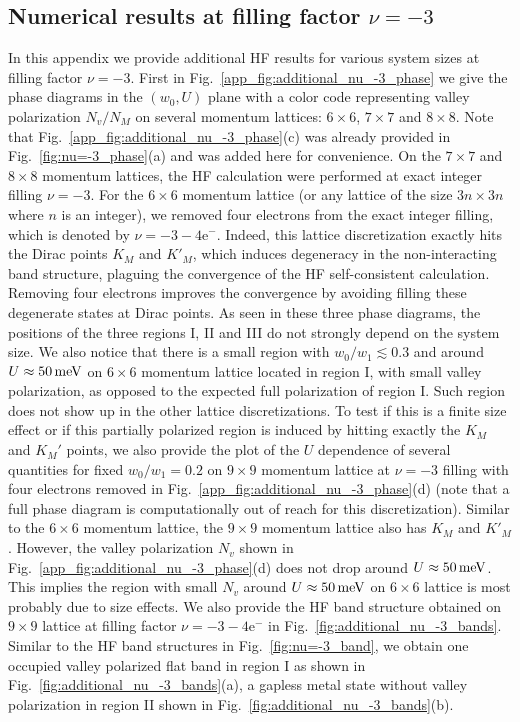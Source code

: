 \documentclass[prb,aps,nofootinbib,amssymb,twocolumn,superscriptaddress,10pt]{revtex4-2}
\begin{document}
\begin{widetext}
\subsection{Numerical results at filling factor \texorpdfstring{$\nu=-3$}{nu=-3}}\label{app_subsec:-3}
In this appendix we provide additional HF results for various system sizes at filling factor $\nu=-3$. First in Fig.~\ref{app_fig:additional_nu_-3_phase} we give the phase diagrams in the $(w_0, U)$ plane with a color code representing valley polarization $N_v/N_M$ on several momentum lattices: $6\times 6$, $7\times 7$ and $8\times 8$. Note that Fig.~\ref{app_fig:additional_nu_-3_phase}(c) was already provided in Fig.~\ref{fig:nu=-3_phase}(a) and was added here for convenience. On the $7\times 7$ and $8\times 8$ momentum lattices, the HF calculation were performed at exact integer filling $\nu=-3$. For the $6\times 6$ momentum lattice (or any lattice of the size $3n \times 3n$ where $n$ is an integer), we removed four electrons from the exact integer filling, which is denoted by $\nu=-3 - 4\mathrm{e}^-$. Indeed, this lattice discretization exactly hits the Dirac points $K_M$ and $K'_M$, which induces degeneracy in the non-interacting band structure, plaguing the convergence of the HF self-consistent calculation. Removing four electrons improves the convergence by avoiding filling these degenerate states at Dirac points. As seen in these three phase diagrams, the positions of the three regions I, II and III do not strongly depend on the system size. We also notice that there is a small region with $w_0/w_1 \lesssim 0.3$ and around $U \approx 50\,\rm meV$ on $6\times 6$ momentum lattice located in region I, with small valley polarization, as opposed to the expected full polarization of region I. 
Such region does not show up in the other lattice discretizations. To test if this is a finite size effect or if this partially polarized region is induced by hitting exactly the $K_M$ and $K_M'$ points, we also provide the plot of the $U$ dependence of several quantities for fixed $w_0/w_1 = 0.2$ on $9\times 9$ momentum lattice at $\nu=-3$ filling with four electrons removed in Fig.~\ref{app_fig:additional_nu_-3_phase}(d) (note that a full phase diagram is computationally out of reach for this discretization).
Similar to the $6\times 6$ momentum lattice, the $9\times 9$ momentum lattice also has $K_M$ and $K'_M$. However, the valley polarization $N_v$ shown in Fig.~\ref{app_fig:additional_nu_-3_phase}(d) does not drop around $U \approx 50\,\rm meV$. This implies the region with small $N_v$ around $U\approx 50\,\rm meV$ on $6\times 6$ lattice is most probably due to size effects. We also provide the HF band structure obtained on $9\times 9$ lattice at filling factor $\nu=-3-4\mathrm{e}^-$ in Fig.~\ref{fig:additional_nu_-3_bands}. Similar to the HF band structures in Fig.~\ref{fig:nu=-3_band}, we obtain one occupied valley polarized flat band in region I as shown in Fig.~\ref{fig:additional_nu_-3_bands}(a), a gapless metal state without valley polarization in region II shown in Fig.~\ref{fig:additional_nu_-3_bands}(b). 

\end{widetext}
\end{document}
